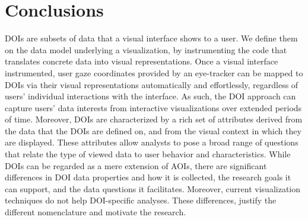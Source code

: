 \section{Conclusions}
\label{sec:DOIAnalysisModelConclusion}
DOIs are subsets of data that a visual interface shows to a user. We define them on the data model underlying a visualization, by instrumenting the code that translates concrete data into visual representations. Once a visual interface instrumented, user gaze coordinates provided by an eye-tracker can be mapped to DOIs via their visual representations automatically and effortlessly, regardless of users' individual interactions with the interface. As such, the DOI approach can capture users' data interests from interactive visualizations over extended periods of time. Moreover, DOIs are characterized by a rich set of attributes derived from the data that the DOIs are defined on, and from the visual context in which they are displayed. These attributes allow analysts to pose a broad range of questions that relate the type of viewed data to user behavior and characteristics. While DOIs can be regarded as a mere extension of AOIs, there are significant differences in DOI data properties and how it is collected, the research goals it can support, and the data questions it facilitates. Moreover, current visualization techniques do not help DOI-specific analyses. These differences, justify the different nomenclature and motivate the research.    

